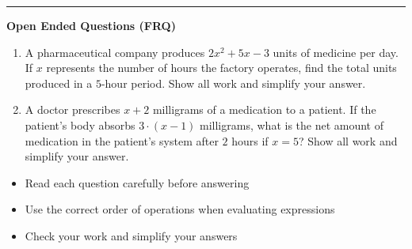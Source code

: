 \documentclass[10pt]{article}
\begin{document}
\vspace{-0.2cm}
\hrule
\vspace{0.2cm}
\textbf{\small Open Ended Questions (FRQ)}
\begin{enumerate}[label=\textbf{Q\arabic*.}, start=9, itemsep=5pt, topsep=0pt]

  \item \small A pharmaceutical company produces $2x^2 + 5x - 3$ units of medicine per day. If $x$ represents the number of hours the factory operates, find the total units produced in a $5$-hour period. Show all work and simplify your answer. \vspace{2cm}

  \item \small A doctor prescribes $x + 2$ milligrams of a medication to a patient. If the patient's body absorbs $3 \cdot (x - 1)$ milligrams, what is the net amount of medication in the patient's system after $2$ hours if $x = 5$? Show all work and simplify your answer. \vspace{2cm}

\end{enumerate}

\vfill

\begin{tcolorbox}[colback=blue!5, colframe=mainblue!50, title=\small \textbf{Chef's Tips}, fonttitle=\bfseries, bottom=1mm]
\begin{itemize}[noitemsep, topsep=2pt, leftmargin=0.5cm]
  \item \scriptsize Read each question carefully before answering\item \scriptsize Use the correct order of operations when evaluating expressions\item \scriptsize Check your work and simplify your answers
\end{itemize}
\end{tcolorbox}
\end{document}
